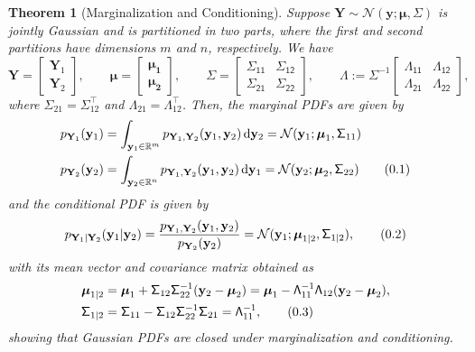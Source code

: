 \documentclass[10pt]{article}
\newtheorem{thm}{Theorem}[section]
\theoremstyle{definition}
\newcommand\eqnum{\addtocounter{equation}{1}\tag{\arabic{section}.\arabic{equation}}}
\DeclareMathOperator{\df}{d\!}
\begin{document}
\begin{thm}[Marginalization and Conditioning]\label{thm:MVN:MC}
Suppose $\mathbf{Y}\sim\mathcal{N}(\mathcal{\mathbf{y}; \boldsymbol{\mu}, \mathsf{\Sigma}})$ is jointly Gaussian and is partitioned in two parts, where the first and second partitions have dimensions $m$ and $n$, respectively. We have
\begin{equation}
\mathbf{Y} =
\begin{bmatrix}
\mathbf{Y}_1 \\
\mathbf{Y}_2
\end{bmatrix}, \qquad
\boldsymbol{\mu} = 
\begin{bmatrix}
\boldsymbol{\mu_1} \\
\boldsymbol{\mu_2}
\end{bmatrix}, \qquad
\mathsf{\Sigma} = 
\begin{bmatrix}
\mathsf{\Sigma_{11}} & \mathsf{\Sigma_{12}} \\
\mathsf{\Sigma_{21}} & \mathsf{\Sigma_{22}}
\end{bmatrix}, \qquad
\mathsf{\Lambda} := \mathsf{\Sigma}^{-1}
\begin{bmatrix}
\mathsf{\Lambda_{11}} & \mathsf{\Lambda_{12}} \\
\mathsf{\Lambda_{21}} & \mathsf{\Lambda_{22}}
\end{bmatrix},
\end{equation}
where $\mathsf{\Sigma}_{21} = \mathsf{\Sigma}_{12}^{\top}$ and $\mathsf{\Lambda}_{21} = \mathsf{\Lambda}_{12}^{\top}$. Then, the marginal PDFs are given by
\begin{align*}
p_{\mathbf{Y}_1}(\mathbf{y}_1) &= \int_{\mathbf{y}_1\in\mathbb{R}^m}p_{\mathbf{Y}_1,\mathbf{Y}_2}(\mathbf{y}_1, \mathbf{y}_2)\df \mathbf{y}_2 = \mathcal{N}(\mathbf{y}_1; \boldsymbol{\mu}_1, \mathsf{\Sigma}_{11}) \\
p_{\mathbf{Y}_2}(\mathbf{y}_2) &= \int_{\mathbf{y}_2\in\mathbb{R}^n}p_{\mathbf{Y}_1,\mathbf{Y}_2}(\mathbf{y}_1, \mathbf{y}_2)\df \mathbf{y}_1 = \mathcal{N}(\mathbf{y}_2; \boldsymbol{\mu}_2, \mathsf{\Sigma}_{22})
\eqnum
\label{eq:MVN:marg}
\end{align*}
and the conditional PDF is given by
\begin{equation*}
p_{\mathbf{Y}_1|\mathbf{Y}_2}(\mathbf{y}_1|\mathbf{y}_2) = \frac{p_{\mathbf{Y}_1,\mathbf{Y}_2}(\mathbf{y}_1,\mathbf{y}_2)}{p_{\mathbf{Y}_2}(\mathbf{y}_2)} = \mathcal{N}(\mathbf{y}_1;\boldsymbol{\mu}_{1|2},\mathsf{\Sigma}_{1|2}),
\eqnum
\end{equation*}
with its mean vector and covariance matrix obtained as
\begin{align*}
\boldsymbol{\mu}_{1|2} &= \boldsymbol{\mu}_1 + \mathsf{\Sigma}_{12}\mathsf{\Sigma}_{22}^{-1}(\mathbf{y}_2-\boldsymbol{\mu}_2) =
\boldsymbol{\mu}_1 - \mathsf{\Lambda}_{11}^{-1}\mathsf{\Lambda}_{12}(\mathbf{y}_2-\boldsymbol{\mu}_2), \\
\mathsf{\Sigma}_{1|2} &= \mathsf{\Sigma}_{11} - \mathsf{\Sigma}_{12} \mathsf{\Sigma}_{22}^{-1} \mathsf{\Sigma}_{21} = \mathsf{\Lambda}_{11}^{-1},
\eqnum
\label{eq:MVN:cond}
\end{align*}
showing that Gaussian PDFs are closed under marginalization and conditioning.
\end{thm}
\end{document}
